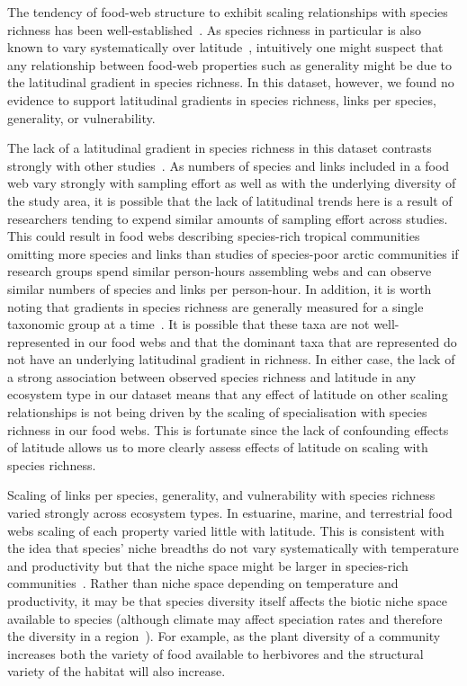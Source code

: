 \documentclass[12pt]{article}
\begin{document}
  The tendency of food-web structure to exhibit scaling relationships with
  species richness has been well-established~\cite{Dunne2004,Riede2010}. As
  species richness in particular is also known to vary systematically over
  latitude~\cite{Kaufman1995,Macpherson2002,Hillebrand2004,Schemske2009},
  intuitively one might suspect that any relationship between food-web
  properties such as generality might be due to the latitudinal gradient in
  species richness. In this dataset, however, we found no evidence to support
  latitudinal gradients in species richness, links per species, generality, 
  or vulnerability.


  The lack of a latitudinal gradient in species richness in this dataset
  contrasts strongly with other
  studies~\cite{Kaufman1995,Macpherson2002,Hillebrand2004,Schemske2009}. As
  numbers of species and links included in a food web vary strongly with
  sampling effort as well as with the underlying diversity of the study area,
  it is possible that the lack of latitudinal trends here is a result of
  researchers tending to expend similar amounts of sampling effort across
  studies. This could result in food webs describing species-rich tropical
  communities omitting more species and links than studies of species-poor
  arctic communities if research groups spend similar person-hours assembling
  webs and can observe similar numbers of species and links per person-hour.
  In addition, it is worth noting that gradients in species richness are
  generally measured for a single taxonomic group at a
  time~\cite{Kaufman1995,Macpherson2002,Hillebrand2004,Schemske2009}. It is
  possible that these taxa are not well-represented in our food webs and that
  the dominant taxa that are represented do not have an underlying latitudinal
  gradient in richness. In either case, the lack of a strong association
  between observed species richness and latitude in any ecosystem type in our dataset
  means that any effect of latitude on other scaling relationships is not being driven by
  the scaling of specialisation with species richness in our food webs. This is fortunate since
  the lack of confounding effects of latitude allows us to more clearly assess
  effects of latitude on scaling with species richness.


  Scaling of links per species, generality, and vulnerability with species
  richness varied strongly across ecosystem types. In estuarine, marine, and
  terrestrial food webs scaling of each property varied little with latitude.
  This is consistent with the idea that species' niche breadths do not vary
  systematically with temperature and productivity but that the niche space
  might be larger in species-rich communities~\cite{Davies2007}. Rather than
  niche space depending on temperature and productivity, it may be that species
  diversity itself affects the biotic niche space available to species (although climate
  may affect speciation rates and therefore the diversity in a region~\cite{Currie2004}). 
  For example, as the plant diversity of a community increases both the 
  variety of food available to herbivores and the structural variety of the habitat will also increase.
\end{document}
